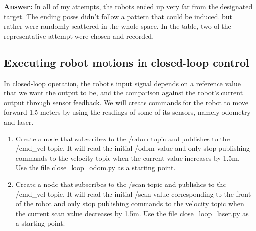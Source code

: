 \documentclass[12pt]{article}
\begin{document}
\begin{enumerate}
    \textbf{Answer: }In all of my attempts, the robots ended up very far from the designated target. The ending poses didn't follow a pattern that could be induced, but rather were randomly scattered in the whole space. In the table, two of the representative attempt were chosen and recorded.

\end{enumerate}

\subsection{Executing robot motions in closed-loop control}
In closed-loop operation, the robot’s input signal depends on a reference value that we want the output to be, and the comparison against the robot’s current output through sensor feedback. We will create commands for the robot to move forward 1.5 meters by using the readings of some of its sensors, namely odometry and laser.

\begin{enumerate}
    \item Create a node that subscribes to the /odom topic and publishes to the /cmd\_vel topic. It will read the initial /odom value and only stop publishing commands to the velocity topic when the current value increases by 1.5m. Use the file close\_loop\_odom.py as a starting point.
    
    \item Create a node that subscribes to the /scan topic and publishes to the /cmd\_vel topic. It will read the initial /scan value corresponding to the front of the robot and only stop publishing commands to the velocity topic when the current scan value decreases by 1.5m. Use the file close\_loop\_laser.py as a starting point.

\end{enumerate}
\end{document}
